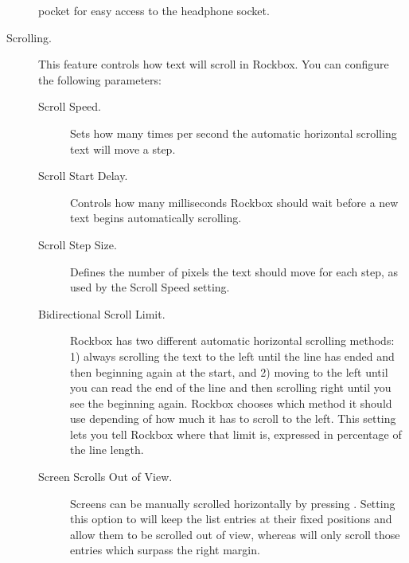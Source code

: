\begin{description}
{\begin{description}
         pocket for easy access to the headphone socket.
    \end{description}
  }
%
  \item[Scrolling.]
    This feature controls how text will scroll in Rockbox. You can configure
    the following parameters:
    \begin{description}
    \item[Scroll Speed.]
      Sets how many times per second the automatic horizontal scrolling text
      will move a step.
    \item[Scroll Start Delay.]
      Controls how many milliseconds Rockbox should wait before a new
      text begins automatically scrolling.
      \item[Scroll Step Size.]
        Defines the number of pixels the text should move for each step, as used
        by the Scroll Speed setting.
    \item[Bidirectional Scroll Limit.]
      Rockbox has two different automatic horizontal scrolling methods: 1) always
      scrolling the text to the left until the line has ended and then beginning
      again at the start, and 2) moving to the left until you can read the end of
      the line and then scrolling right until you see the beginning again.
      Rockbox chooses which method it should use depending of how much it has to
      scroll to the left. This setting lets you tell Rockbox where that limit
      is, expressed in percentage of the line length.
    \item[Screen Scrolls Out of View.]
      Screens can be manually scrolled horizontally by pressing
      .
      Setting this option to 
      will keep the list entries at their fixed positions and allow them to be
      scrolled out of view, whereas  will only scroll those entries
      which surpass the right margin.

\end{description}
\end{description}
